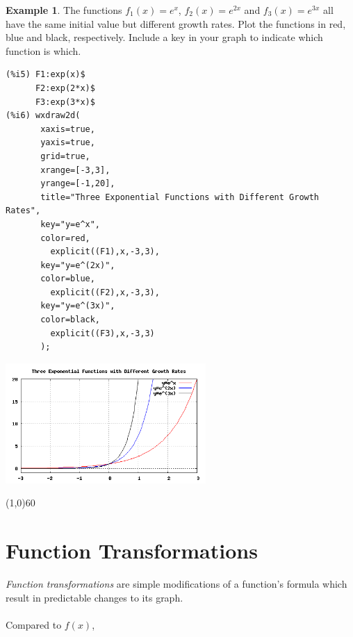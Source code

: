 \documentclass[10.5pt,twoside]{report}
\theoremstyle{definition}
\newtheorem{exmp}{Example}[section]
\begin{document}
\begin{exmp}

The functions $f_1(x)=e^x$, $f_2(x)=e^{2x}$ and $f_3(x)=e^{3x}$ all have the same initial value but different growth rates.  Plot the functions in red, blue and black, respectively.  Include a key in your graph to indicate which function is which.\\

\begin{verbatim}
(%i5) F1:exp(x)$
      F2:exp(2*x)$
      F3:exp(3*x)$
(%i6) wxdraw2d(
       xaxis=true,
       yaxis=true,
       grid=true,
       xrange=[-3,3],
       yrange=[-1,20],
       title="Three Exponential Functions with Different Growth Rates",
       key="y=e^x",
       color=red,
         explicit((F1),x,-3,3),
       key="y=e^(2x)",
       color=blue,
         explicit((F2),x,-3,3),
       key="y=e^(3x)",
       color=black,
         explicit((F3),x,-3,3)
       );
\end{verbatim}

\includegraphics[width=3in]{example_1_3_2}

\end{exmp}

\line(1,0){60}
\linethickness{0.5mm}
\pagebreak

\section{Function Transformations}\label{Function Transformations}

\textit{Function transformations} are simple modifications of a function's formula which result in predictable changes to its graph. \\
${}$\\
Compared to $f(x)$,\\
${}$\\
 
\end{document}
